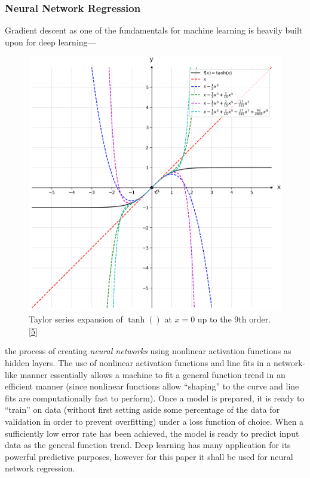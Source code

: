 \documentclass[12pt]{article}
\begin{document}
\begin{multicols}{2}
\subsubsection{Neural Network Regression}
Gradient descent as one of the fundamentals for machine learning is heavily built upon for deep learning---
\begin{figure}[H]
    \centering
    \includegraphics[width=0.98\linewidth]{figs/figure6.png}
    \caption{
        Taylor series expansion of $\tanh()$ at $x=0$ up to the 9th order. [\hyperref[sec:5]{5}]
    }
    \label{fig:6}
\end{figure}
\noindent
the process of creating \textit{neural networks} using nonlinear activation functions as hidden layers.
The use of nonlinear activation functions and line fits in a network-like manner essentially allows a machine to fit a general function trend in an efficient manner (since nonlinear functions allow ``shaping'' to the curve and line fits are computationally fast to perform).
Once a model is prepared, it is ready to ``train'' on data (without first setting aside some percentage of the data for validation in order to prevent overfitting) under a loss function of choice.
When a sufficiently low error rate has been achieved, the model is ready to predict input data as the general function trend.
Deep learning has many application for its powerful predictive purposes, however for this paper it shall be used for neural network regression.


\end{multicols}
\end{document}
